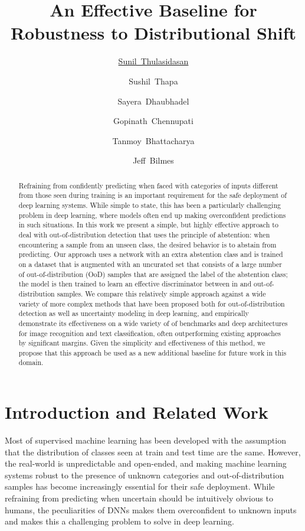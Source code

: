 \documentclass[accepted]{uai2021} \pdfoutput=1
\title{An Effective  Baseline for Robustness to Distributional Shift}
\author[1,3]{\href{mailto:Sunil Thulasidasan <sunil@lanl.gov>?Subject=DAC OoD paper}{Sunil~Thulasidasan}{}}
\author[2]{Sushil~Thapa}{}
\author[1]{Sayera~Dhaubhadel}
\author[1]{Gopinath~Chennupati}
\author[1]{Tanmoy~Bhattacharya}
\author[3]{Jeff~Bilmes}
\affil[1]{Los Alamos National Laboratory\\
    Los Alamos, NM, USA
}
\affil[2]{Dept. of Computer Science and Engineering\\
    New Mexico Tech\\
    Socorro, NM, USA
}
\affil[3]{Dept. of Electrical \& Computer Engineering\\
    University of Washington\\
    Seattle, USA
}
\begin{document}
\maketitle

\begin{abstract}
Refraining from confidently predicting when faced with  categories of inputs different from those seen during training is an important requirement for the safe deployment of deep learning systems. While simple to state, this has been  a particularly challenging problem in deep learning, where models often end up making overconfident predictions in such situations. In this work we present a simple, but highly effective approach to deal with out-of-distribution detection that uses the principle of abstention: when encountering a sample from an unseen class, the desired behavior is to abstain from predicting. Our  approach uses a network with an extra abstention class and is trained on a dataset that  is augmented with an uncurated  set that consists of a large number of out-of-distribution (OoD) samples that are assigned the label of the abstention class; the model is then trained to learn an effective discriminator between in and out-of-distribution samples. We  compare this relatively simple approach against a wide variety of more complex methods that have been proposed both for out-of-distribution detection as well as uncertainty modeling in deep learning, and empirically demonstrate its effectiveness on a wide variety of of benchmarks and deep architectures for image recognition and text classification, often outperforming existing approaches by significant margins. Given the simplicity and effectiveness of this method, we propose that this approach be used as a new additional baseline for future work in this domain.
\end{abstract}

\section{Introduction and Related Work}
\label{sec:intro}



Most of supervised machine learning has been developed with the assumption that the distribution of classes seen at train and test time are the same. However, the real-world is unpredictable and open-ended, and making machine learning systems robust to the presence of unknown categories and out-of-distribution samples has become increasingly essential for their safe deployment. While refraining from predicting when uncertain should be intuitively obvious to humans, the peculiarities of DNNs makes them overconfident to unknown inputs~\cite{nguyen2015deep} and makes this a challenging problem to solve in deep learning.
\end{document}
